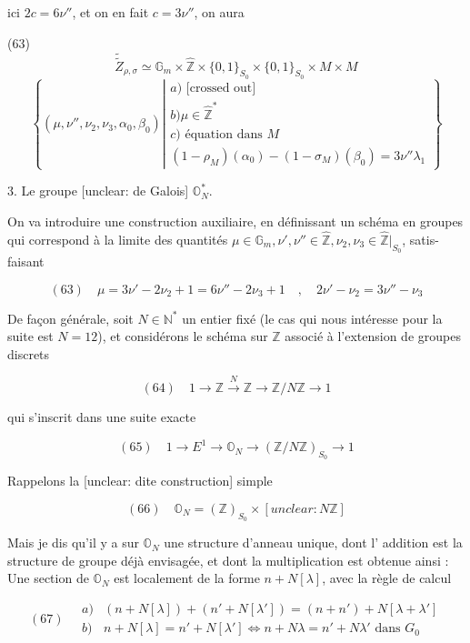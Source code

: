 ici
$2c = 6\nu''$, et on en fait
$c = 3\nu''$, on aura

(63) $$ \tilde{\tilde{Z}}_{\rho,\sigma} \simeq \mathbb{G}_m \times \hat{\mathbb{Z}} \times \{0,1\}_{S_0} \times \{0,1\}_{S_0} \times M \times M $$
$$ \left\{ (\mu,\nu'',\nu_2,\nu_3,\alpha_0,\beta_0) \left| \begin{array}{l} a) \text{ [crossed out] } \\ b) \mu \in \hat{\mathbb{Z}}^* \\ c) \text{ équation dans } M \\ (1-\rho_M)(\alpha_0) - (1-\sigma_M)(\beta_0) = 3\nu'' \lambda_1 \end{array} \right. \right\} $$

\newpage


3. Le groupe [unclear: de Galois] $\mathbb{O}_N^*$.

On va introduire une construction auxiliaire,
en définissant un schéma en groupes qui
correspond à la limite des quantités
$\mu \in \mathbb{G}_m, \nu', \nu'' \in \hat{\mathbb{Z}}, \nu_2, \nu_3 \in \hat{\mathbb{Z}}|_{S_0}$, satis-
faisant

$$(63) \quad \mu = 3\nu' - 2\nu_2 + 1 = 6\nu'' - 2\nu_3 + 1 \quad , \quad 2\nu' - \nu_2 = 3\nu'' - \nu_3$$

De façon générale, soit $N \in \mathbb{N}^*$ un entier fixé
(le cas qui nous intéresse pour la suite est
$N=12$), et considérons le schéma sur $\mathbb{Z}$ associé
à l'extension de groupes discrets

$$(64) \quad 1 \to \mathbb{Z} \xrightarrow{N} \mathbb{Z} \to \mathbb{Z}/N\mathbb{Z} \to 1$$

qui s'inscrit dans une suite exacte

$$(65) \quad 1 \to E^1 \to \mathbb{O}_N \to (\mathbb{Z}/N\mathbb{Z})_{S_0} \to 1$$

Rappelons la [unclear: dite construction] simple

$$(66) \quad \mathbb{O}_N = (\mathbb{Z})_{S_0} \times [unclear: N\mathbb{Z}]$$

Mais je dis qu'il y a sur $\mathbb{O}_N$ une
structure d'anneau unique, dont l'
addition est la structure de groupe déjà
envisagée, et dont la multiplication est
obtenue ainsi : Une section de $\mathbb{O}_N$ est
localement de la forme $n + N[\lambda]$, avec
la règle de calcul

$$(67) \quad \begin{matrix} a) & (n + N[\lambda]) + (n' + N[\lambda']) = (n+n') + N[\lambda+\lambda'] \\ b) & n + N[\lambda] = n' + N[\lambda'] \iff n+N\lambda = n'+N\lambda' \text{ dans } G_0 \end{matrix}$$

